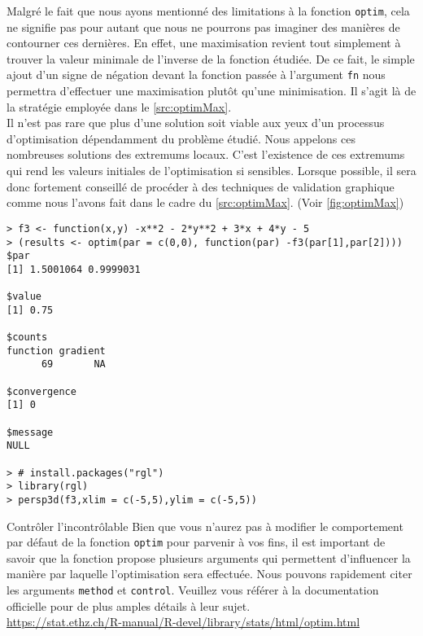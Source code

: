 \vspace{\baselineskip}
Malgré le fait que nous ayons mentionné des limitations à la fonction \texttt{optim}, cela ne signifie pas pour autant que nous ne pourrons pas imaginer des manières de contourner ces dernières. En effet, une maximisation revient tout simplement à trouver la valeur minimale de l'inverse de la fonction étudiée. De ce fait, le simple ajout d'un signe de négation devant la fonction passée à l'argument \texttt{fn} nous permettra d'effectuer une maximisation plutôt qu'une minimisation. Il s'agit là de la stratégie employée dans le \autoref{src:optimMax}. \\

Il n’est pas rare que plus d’une solution soit viable aux yeux d’un processus d’optimisation dépendamment du problème étudié. Nous appelons ces nombreuses solutions des extremums locaux. C'est l'existence de ces extremums qui rend les valeurs initiales de l'optimisation si sensibles. Lorsque possible, il sera donc fortement conseillé de procéder à des techniques de validation graphique comme nous l'avons fait dans le cadre du \autoref{src:optimMax}. (Voir \autoref{fig:optimMax}) \\

\begin{lstlisting}[caption = Maximisation d'une fonction avec \texttt{optim},label=src:optimMax]
> f3 <- function(x,y) -x**2 - 2*y**2 + 3*x + 4*y - 5
> (results <- optim(par = c(0,0), function(par) -f3(par[1],par[2])))
$par
[1] 1.5001064 0.9999031

$value
[1] 0.75

$counts
function gradient 
      69       NA 

$convergence
[1] 0

$message
NULL

> # install.packages("rgl")
> library(rgl)
> persp3d(f3,xlim = c(-5,5),ylim = c(-5,5))
\end{lstlisting}


\begin{moreInfo}{Contrôler l'incontrôlable}
	Bien que vous n'aurez pas à modifier le comportement par défaut de la fonction \texttt{optim} pour parvenir à vos fins, il est important de savoir que la fonction propose plusieurs arguments qui permettent d'influencer la manière par laquelle l'optimisation sera effectuée. Nous pouvons rapidement citer les arguments \texttt{method} et \texttt{control}. Veuillez vous référer à la documentation officielle pour de plus amples détails à leur sujet. \\
	\url{https://stat.ethz.ch/R-manual/R-devel/library/stats/html/optim.html}
\end{moreInfo}

